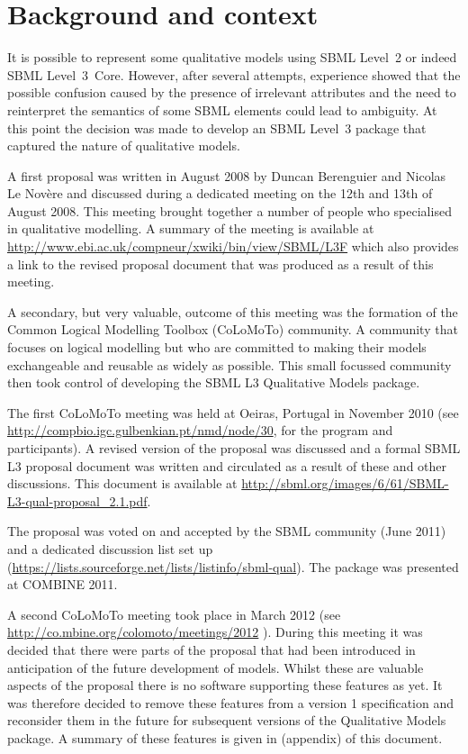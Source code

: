 
\section{Background and context}
\label{background}

It is possible to represent some qualitative models using SBML Level~2 or indeed SBML Level~3~Core. However,  after several attempts, experience showed that the possible confusion caused by the presence of irrelevant attributes and the need to reinterpret the semantics of some SBML elements could lead to ambiguity. At this point the decision was made to develop an SBML Level~3 package that captured the nature of qualitative models.


A first proposal was written in August 2008 by Duncan Berenguier and Nicolas Le Nov\`ere and discussed during a dedicated meeting on the 12th and 13th of August 2008. This meeting brought together a number of people who specialised in qualitative modelling. A summary of the meeting is available at \url{http://www.ebi.ac.uk/compneur/xwiki/bin/view/SBML/L3F} which also provides a link to the revised proposal document that was produced as a result of this meeting.

A secondary, but very valuable, outcome of this meeting was the formation of the Common Logical Modelling Toolbox (CoLoMoTo) community. A community that focuses on logical modelling but who are committed to making their models exchangeable and reusable as widely as possible.  This small focussed community then took control of developing the SBML L3 Qualitative Models package.

The first CoLoMoTo meeting was held at Oeiras, Portugal in November 2010 (see \url{http://compbio.igc.gulbenkian.pt/nmd/node/30}, for the program and participants). A revised version of the proposal was discussed  and a formal SBML L3 proposal document was written and circulated as a result of these and other discussions.
This document is available at \url{http://sbml.org/images/6/61/SBML-L3-qual-proposal_2.1.pdf}.

The proposal was voted on and accepted by the SBML community (June 2011) and a dedicated discussion list set up (\url{https://lists.sourceforge.net/lists/listinfo/sbml-qual}). The package was presented at COMBINE 2011.

A second CoLoMoTo meeting took place in March 2012 (see \url{http://co.mbine.org/colomoto/meetings/2012} ). During this meeting it was decided that there were parts of the proposal that had been introduced in anticipation of the future development of models. Whilst these are valuable aspects of the proposal there is no software supporting these features as yet. It was therefore decided to remove these features from a version 1 specification and reconsider them in the future for subsequent versions of the Qualitative Models package. A summary of these features is given in  (appendix) of this document.


